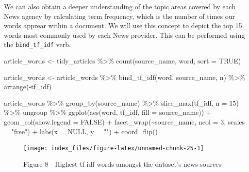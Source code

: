 \documentclass[
]{article}
\newenvironment{Shaded}{\begin{snugshade}}{\end{snugshade}}
\newcommand{\AttributeTok}[1]{\textcolor[rgb]{0.77,0.63,0.00}{#1}}
\newcommand{\ConstantTok}[1]{\textcolor[rgb]{0.00,0.00,0.00}{#1}}
\newcommand{\DecValTok}[1]{\textcolor[rgb]{0.00,0.00,0.81}{#1}}
\newcommand{\FunctionTok}[1]{\textcolor[rgb]{0.00,0.00,0.00}{#1}}
\newcommand{\NormalTok}[1]{#1}
\newcommand{\OtherTok}[1]{\textcolor[rgb]{0.56,0.35,0.01}{#1}}
\newcommand{\SpecialCharTok}[1]{\textcolor[rgb]{0.00,0.00,0.00}{#1}}
\newcommand{\StringTok}[1]{\textcolor[rgb]{0.31,0.60,0.02}{#1}}
\begin{document}
We can also obtain a deeper understanding of the topic areas covered by
each News agency by calculating term frequency, which is the number of
times our words apprear within a document. We will use this concept to
depict the top 15 words most commonly used by each News provider. This
can be performed using the \texttt{bind\_tf\_idf} verb.

\begin{Shaded}
\begin{Highlighting}[]
\NormalTok{article\_words }\OtherTok{\textless{}{-}}\NormalTok{   tidy\_articles }\SpecialCharTok{\%\textgreater{}\%}
                   \FunctionTok{count}\NormalTok{(source\_name, word, }\AttributeTok{sort =} \ConstantTok{TRUE}\NormalTok{)}


\NormalTok{article\_words }\OtherTok{\textless{}{-}}\NormalTok{ article\_words }\SpecialCharTok{\%\textgreater{}\%}
                 \FunctionTok{bind\_tf\_idf}\NormalTok{(word, source\_name, n) }\SpecialCharTok{\%\textgreater{}\%}
                 \FunctionTok{arrange}\NormalTok{(}\SpecialCharTok{{-}}\NormalTok{tf\_idf)}
                 
\NormalTok{article\_words }\SpecialCharTok{\%\textgreater{}\%}
  \FunctionTok{group\_by}\NormalTok{(source\_name) }\SpecialCharTok{\%\textgreater{}\%}
  \FunctionTok{slice\_max}\NormalTok{(tf\_idf, }\AttributeTok{n =} \DecValTok{15}\NormalTok{) }\SpecialCharTok{\%\textgreater{}\%}
\NormalTok{  ungroup }\SpecialCharTok{\%\textgreater{}\%}
  \FunctionTok{ggplot}\NormalTok{(}\FunctionTok{aes}\NormalTok{(word, tf\_idf, }\AttributeTok{fill =}\NormalTok{ source\_name)) }\SpecialCharTok{+}
  \FunctionTok{geom\_col}\NormalTok{(}\AttributeTok{show.legend =} \ConstantTok{FALSE}\NormalTok{) }\SpecialCharTok{+} 
  \FunctionTok{facet\_wrap}\NormalTok{(}\SpecialCharTok{\textasciitilde{}}\NormalTok{source\_name, }\AttributeTok{ncol =} \DecValTok{3}\NormalTok{, }\AttributeTok{scales =} \StringTok{"free"}\NormalTok{) }\SpecialCharTok{+} 
  \FunctionTok{labs}\NormalTok{(}\AttributeTok{x =} \ConstantTok{NULL}\NormalTok{, }\AttributeTok{y =} \StringTok{""}\NormalTok{) }\SpecialCharTok{+} 
  \FunctionTok{coord\_flip}\NormalTok{()}
\end{Highlighting}
\end{Shaded}

\begin{figure}

{\centering \texttt{[image: index\_files/figure-latex/unnamed-chunk-25-1]} 

}

\caption{Figure 8 - Highest tf-idf words amongst the dataset's news sources}\label{fig:unnamed-chunk-25}
\end{figure}
\end{document}
